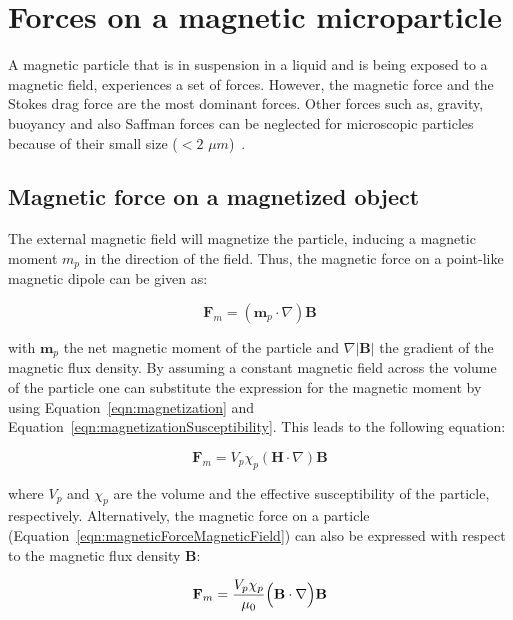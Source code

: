 \section{Forces on a magnetic microparticle}
A magnetic particle that is in suspension in a liquid and is being exposed to a magnetic field, experiences a set of forces. However, the magnetic force and the Stokes drag force are the most dominant forces. Other forces such as, gravity, buoyancy and also Saffman forces can be neglected for microscopic particles because of their small size ($<2$ $\mu m$)~\cite{McCloskey2000,Wirix-Speetjens2005,Saffman1965}. 

\subsection{Magnetic force on a magnetized object}
The external magnetic field will magnetize the particle, inducing a magnetic moment $m_{p}$ in the direction of the field. Thus, the magnetic force on a point-like magnetic dipole can be given as:

\begin{equation}
	\mathbf{F}_{m} = (\mathbf{m}_{p} \cdot \nabla)\mathbf{B}
	\label{eqn:magneticForceMagneticMoment}
\end{equation}

with $\mathbf{m}_{p}$ the net magnetic moment of the particle and $\nabla |\mathbf{B}|$ the gradient of the magnetic flux density. By assuming a constant magnetic field across the volume of the particle one can substitute the expression for the magnetic moment by using Equation~\ref{eqn:magnetization} and Equation~\ref{eqn:magnetizationSusceptibility}. This leads to the following equation:

\begin{equation}
	\mathbf{F}_{m} = V_{p} \chi_{p}(\mathbf{H}\cdot \nabla)\mathbf{B} 
	\label{eqn:magneticForceMagneticField}
\end{equation} 

where $V_{p}$ and $\chi_{p}$ are the volume and the effective susceptibility of the particle, respectively. Alternatively, the magnetic force on a particle (Equation~\ref{eqn:magneticForceMagneticField}) can also be expressed with respect to the magnetic flux density $\mathbf{B}$:

\begin{equation}
	\mathbf{F}_{m} = \frac{V_{p} \chi_{p}}{\mu_{0}}\Bigl( \mathbf{B}\cdot \nabla \Bigr)\mathbf{B} 
	\label{eqn:magneticForceMagneticFlux}
\end{equation} 

